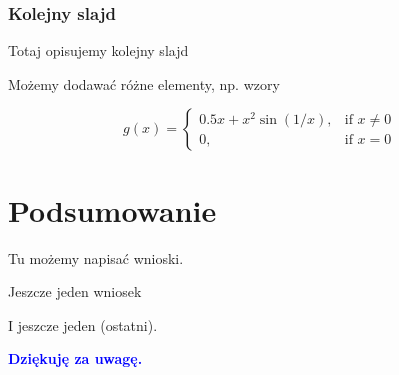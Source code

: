 \documentclass{beamer}
\begin{document}
\begin{frame}
\frametitle{Kolejny slajd}
Totaj opisujemy kolejny slajd

Możemy dodawać różne elementy, np. wzory

$$ g(x)=
\begin{cases}
0.5x+x^2\sin(1/x), &\text{if }x\neq0 \\
0, &\text{if }x=0
\end{cases}
$$
\end{frame}

\section{Podsumowanie}

\begin{frame}
Tu możemy napisać wnioski.

\vspace{.5cm}

Jeszcze jeden wniosek
\vspace{.5cm}

I jeszcze jeden (ostatni).
\vspace{2cm}


\pause
\textbf{\textcolor{blue}{Dziękuję za uwagę.}}
\end{frame}
\end{document}
